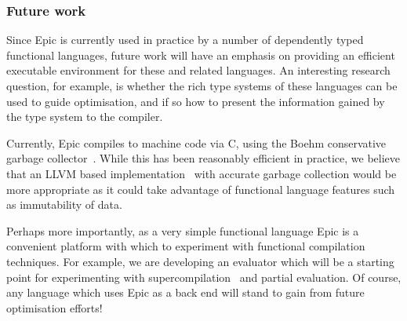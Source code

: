 \subsubsection{Future work}


Since Epic is currently used in practice by a number of dependently
typed functional languages, future work will have an emphasis on
providing an efficient executable environment for these and related
languages. An interesting research question, for example, is whether
the rich type systems of these languages can be used to guide
optimisation, and if so how to present the information gained by the
type system to the compiler.

Currently, Epic compiles to machine code via C, using the Boehm
conservative garbage collector~\cite{boehm-gc}. While this has been
reasonably efficient in practice, we believe that an LLVM based
implementation~\cite{llvm,llvm-haskell} with accurate garbage
collection would be more appropriate as it could take advantage of
functional language features such as immutability of data. 

Perhaps more importantly, as a very simple functional language Epic is
a convenient platform with which to experiment with functional
compilation techniques. For example, we are developing an evaluator
which will be a starting point for experimenting with
supercompilation~\cite{mitchell-super} and partial evaluation.
Of course, any language which uses Epic as a back end will stand to
gain from future optimisation efforts!
